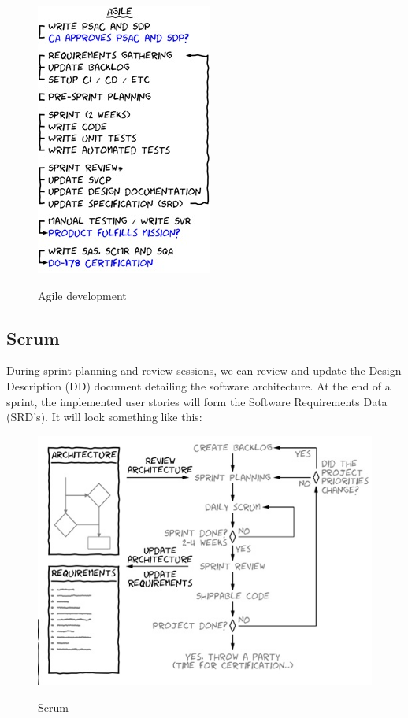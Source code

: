 \documentclass[a4paper]{article}
\begin{document}
\begin{center}
\begin{figure}[H]
\includegraphics[width=0.5\linewidth]{./pictures/agile.jpg}\\
\caption{\label{fig:Agile}Agile development}
\end{figure}
\end{center}


\subsection{Scrum}
During sprint planning and review sessions, we can review and update the Design Description (DD) document detailing the software architecture. At the end of a sprint, the implemented user stories will form the Software Requirements Data (SRD's). It will look something like this:

\begin{center}
\begin{figure}[H]
\includegraphics[width=0.7\linewidth]{./pictures/scrum.jpg}\\
\caption{\label{fig:Scrum}Scrum}
\end{figure}
\end{center}
\end{document}
